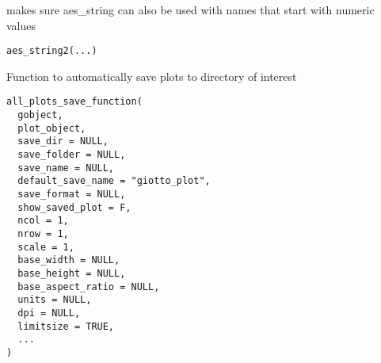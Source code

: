 \documentclass[a4paper]{book}
\begin{document}
%
\begin{Description}\relax
makes sure aes\_string can also be used with names that start with numeric values
\end{Description}
%
\begin{Usage}
\begin{verbatim}
aes_string2(...)
\end{verbatim}
\end{Usage}
%
\begin{Description}\relax
Function to automatically save plots to directory of interest
\end{Description}
%
\begin{Usage}
\begin{verbatim}
all_plots_save_function(
  gobject,
  plot_object,
  save_dir = NULL,
  save_folder = NULL,
  save_name = NULL,
  default_save_name = "giotto_plot",
  save_format = NULL,
  show_saved_plot = F,
  ncol = 1,
  nrow = 1,
  scale = 1,
  base_width = NULL,
  base_height = NULL,
  base_aspect_ratio = NULL,
  units = NULL,
  dpi = NULL,
  limitsize = TRUE,
  ...
)
\end{verbatim}
\end{Usage}
%
\end{document}

